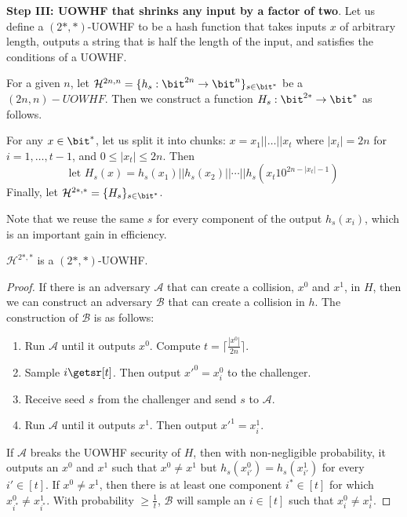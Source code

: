 \noindent\textbf{Step III: UOWHF that shrinks any input by a factor of two}.
Let us define a $(2{*}, {*})$-UOWHF to be a hash function that takes inputs $x$ of arbitrary length, outputs a string that is half the length of the input, and satisfies the conditions of a UOWHF.

\begin{construction}[a $(2{*}, {*})$-UOWHF]
    For a given $n$, let $\mathcal{H}^{2n, n} = \{h_s:\bit^{2n}\rightarrow\bit^{n}\}_{s\in\bit^{*}}$ be a $(2n, n)-UOWHF$. Then we construct a function $H_s:\bit^{2*} \to \bit^*$ as follows. 
    
    For any $x \in \bit^*$, let us split it into chunks: $x=x_1 || \dots || x_t$ where $|x_i|=2n$ for $i=1,\dots,t-1$, and $0\leq|x_t|\leq 2n$. Then
    \[
    \text{let } H_s(x)=h_s(x_1) || h_s(x_2) || \cdots || h_s(x_{t}10^{2n-|x_t|-1})
    \]
    Finally, let $\mathcal{H}^{2*, *} = \{H_s\}_{s \in \bit^*}$.
\end{construction}
Note that we reuse the same $s$ for every component of the output $h_s(x_i)$, which is an important gain in efficiency.

\begin{claim}
    $\mathcal{H}^{2*, *}$ is a $(2{*}, {*})$-UOWHF.
\end{claim}
\begin{proof}
If there is an adversary $\mathcal{A}$ that can create a collision, $x^0$ and $x^1$, in $H$, then we can construct an adversary $\mathcal{B}$ that can create a collision in $h$. The construction of $\mathcal{B}$ is as follows:
\begin{enumerate}
    \item Run $\mathcal{A}$ until it outputs $x^0$. Compute $t = \lceil\frac{|x^0|}{2n}\rceil$.
    \item Sample $i \getsr [t]$. Then output $x'^0 = x^0_{i}$ to the challenger.
    \item Receive seed $s$ from the challenger and send $s$ to $\mathcal{A}$.
    \item Run $\mathcal{A}$ until it outputs $x^1$. Then output $x'^1 = x^1_{i}$.
\end{enumerate}

If $\mathcal{A}$ breaks the UOWHF security of $H$, then with non-negligible probability, it outputs an $x^0$ and $x^1$ such that $x^0 \neq x^1$ but $h_s(x^0_{i'})=h_s(x^1_{i'})$ for every $i' \in [t]$. If $x^0 \neq x^1$, then there is at least one component $i^* \in [t]$ for which $x^0_{i^*} \neq x^1_{i^*}$. With probability $\geq \frac{1}{t}$, $\mathcal{B}$ will sample an $i \in [t]$ such that $x^0_{i} \neq x^1_{i}$.
\end{proof}
\vspace{5mm}

